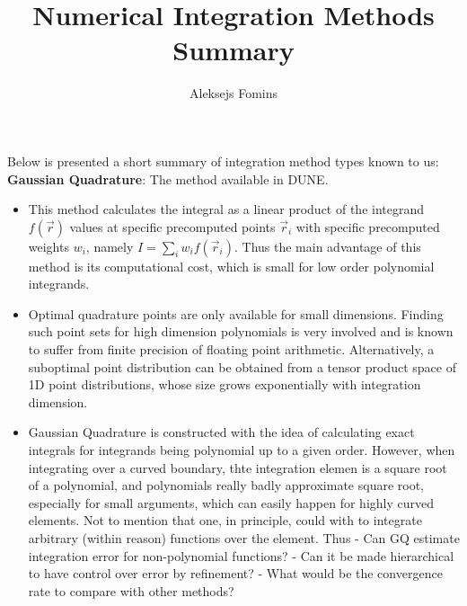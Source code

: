 \documentclass[12pt]{article}
\title{Numerical Integration Methods Summary}
\author{Aleksejs Fomins}
\date{}
\begin{document}
 


\maketitle 

\noindent
Below is presented a short summary of integration method types known to us: \\

\noindent
\textbf{Gaussian Quadrature}: The method available in DUNE.
\begin{itemize}
	\item This method calculates the integral as a linear product of the integrand $f(\vec{r})$ values at specific precomputed points $\vec{r}_i$ with specific precomputed weights $w_i$, namely $I = \sum_i w_i f(\vec{r}_i)$. Thus the main advantage of this method is its computational cost, which is small for low order polynomial integrands.
	\item Optimal quadrature points are only available for small dimensions. Finding such point sets for high dimension polynomials is very involved and is known to suffer from finite precision of floating point arithmetic. Alternatively, a suboptimal point distribution can be obtained from a tensor product space of 1D point distributions, whose size grows exponentially with integration dimension.
	\item Gaussian Quadrature is constructed with the idea of calculating exact integrals for integrands being polynomial up to a given order. However, when integrating over a curved boundary, thte integration elemen is a square root of a polynomial, and polynomials really badly approximate square root, especially for small arguments, which can easily happen for highly curved elements. Not to mention that one, in principle, could with to integrate arbitrary (within reason) functions over the element. Thus
		\subitem - Can GQ estimate integration error for non-polynomial functions?
		\subitem - Can it be made hierarchical to have control over error by refinement?
		\subitem - What would be the convergence rate to compare with other methods?
\end{itemize}
\end{document}
